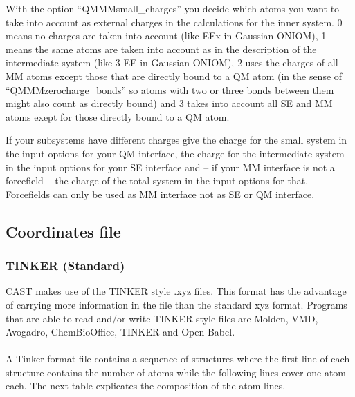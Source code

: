 \documentclass[10pt,a4paper]{article} %
\begin{document}
With the option ``QMMMsmall\_charges'' you decide which atoms you want to take into account as external charges in the calculations for the inner system. 0 means no charges are taken into account (like EEx in Gaussian-ONIOM), 1 means the same atoms are taken into account as in the description of the intermediate system (like 3-EE in Gaussian-ONIOM), 2 uses the charges of all MM atoms except those that are directly bound to a QM atom (in the sense of ``QMMMzerocharge\_bonds'' so atoms with two or three bonds between them might also count as directly bound) and 3 takes into account all SE and MM atoms exept for those directly bound to a QM atom.

If your subsystems have different charges give the charge for the small system in the input options for your QM interface, the charge for the intermediate system in the input options for your SE interface and -- if your MM interface is not a forcefield -- the charge of the total system in the input options for that. Forcefields can only be used as MM interface not as SE or QM interface. 
			
	\subsection{Coordinates file}
	
	\subsubsection{TINKER (Standard)}
	\ac{CAST} makes use of the TINKER\supercite{tinker} style .xyz files. This format has the advantage of carrying more information in the file than the standard xyz format. Programs that are able to read and/or write TINKER style files are Molden\supercite{molden}, \ac{VMD}\supercite{vmd}, Avogadro\supercite{avogadro}, ChemBioOffice\supercite{chembiooffice}, TINKER\supercite{tinker} and Open Babel\supercite{openbabel}. \\~\\
	A Tinker format file contains a sequence of structures where the first line of each structure contains the number of atoms while the following lines cover one atom each. The next table explicates the composition of the atom lines.\\~\\
\end{document}
